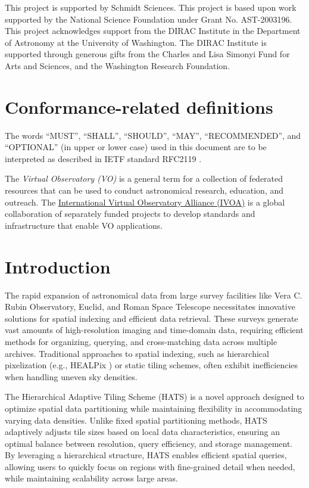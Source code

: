 \documentclass[11pt,a4paper]{ivoa}
\begin{document}
This project is supported by Schmidt Sciences.
This project is based upon work supported by the National Science Foundation under Grant No. AST-2003196.
This project acknowledges support from the DIRAC Institute in the Department of Astronomy at the University of Washington. The DIRAC Institute is supported through generous gifts from the Charles and Lisa Simonyi Fund for Arts and Sciences, and the Washington Research Foundation.


\section*{Conformance-related definitions}
The words ``MUST'', ``SHALL'', ``SHOULD'', ``MAY'', ``RECOMMENDED'', and
``OPTIONAL'' (in upper or lower case) used in this document are to be
interpreted as described in IETF standard RFC2119 \citep{std:RFC2119}.

The \emph{Virtual Observatory (VO)} is a
general term for a collection of federated resources that can be used
to conduct astronomical research, education, and outreach.
The \href{https://www.ivoa.net}{International
Virtual Observatory Alliance (IVOA)} is a global
collaboration of separately funded projects to develop standards and
infrastructure that enable VO applications.

\section{Introduction}
The rapid expansion of astronomical data from large survey facilities like Vera C. Rubin Observatory, Euclid, and Roman Space Telescope necessitates innovative solutions for spatial indexing and efficient data retrieval. 
These surveys generate vast amounts of high-resolution imaging and time-domain data, requiring efficient methods for organizing, querying, and cross-matching data across multiple archives. 
Traditional approaches to spatial indexing, such as hierarchical pixelization (e.g., HEALPix  \citep{gorski:healpix}) or static tiling schemes, often exhibit inefficiencies when handling uneven sky densities.

The Hierarchical Adaptive Tiling Scheme (HATS) is a novel approach designed to optimize spatial data partitioning while maintaining flexibility in accommodating varying data densities. 
Unlike fixed spatial partitioning methods, HATS adaptively adjusts tile sizes based on local data characteristics, ensuring an optimal balance between resolution, query efficiency, and storage management. 
By leveraging a hierarchical structure, HATS enables efficient spatial queries, allowing users to quickly focus on regions with fine-grained detail when needed, while maintaining scalability across large areas.
\end{document}
